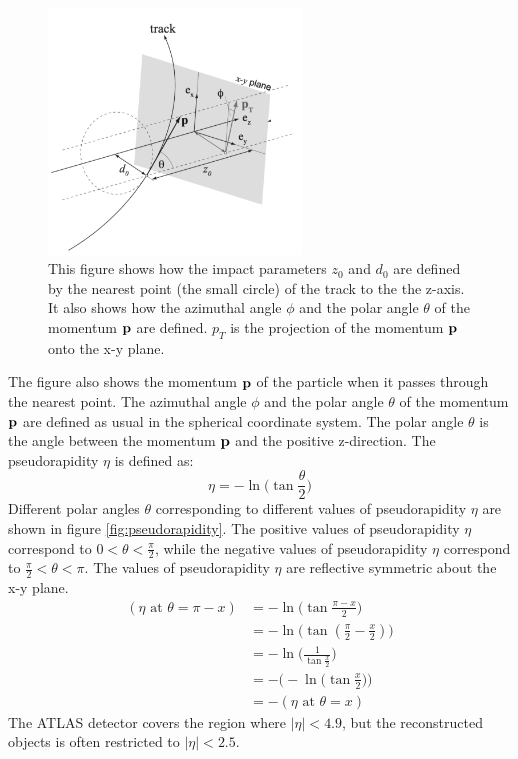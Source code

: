 \begin{figure}
\centering
\includegraphics[width=0.6\textwidth]{data/photo/detector/impact_parameter.png}
\caption{This figure shows how the impact parameters $z_0$ and $d_0$ are defined by the nearest point (the small circle) of the track to the the z-axis. It also shows how the azimuthal angle $\phi$ and the polar angle $\theta$ of the momentum $\bf{p}$ are defined. $p_T$ is the projection of the momentum $\bf{p}$ onto the x-y plane.}
\label{fig:impact_parameter}
\end{figure}

The figure also shows the momentum $\bf{p}$ of the particle when it passes through the nearest point.
The azimuthal angle $\phi$ and the polar angle $\theta$ of the momentum $\bf{p}$ are defined as usual in the spherical coordinate system.
The polar angle $\theta$ is the angle between the momentum $\bf{p}$ and the positive z-direction.
The pseudorapidity $\eta$ is defined as:
\begin{equation}
\eta = - \ln \Big( \tan \frac{\theta}{2} \Big)
\end{equation}
Different polar angles $\theta$ corresponding to different values of pseudorapidity $\eta$ are shown in figure \ref{fig:pseudorapidity}.
The positive values of pseudorapidity $\eta$ correspond to $0 <\theta< \frac{\pi}{2}$, while the negative values of pseudorapidity $\eta$ correspond to $\frac{\pi}{2} <\theta< \pi$.
The values of pseudorapidity $\eta$ are reflective symmetric about the x-y plane.
\begin{align}
( \eta \text{ at } \theta = \pi - x) &= - \ln \Big( \tan \frac{\pi - x}{2} \Big) \\
&= - \ln \Big( \tan (\frac{\pi}{2} - \frac{x}{2}) \Big) \\
&= - \ln \Big( \frac{1}{ \tan \frac{x}{2} } \Big) \\
&= - \Big( - \ln \Big( \tan \frac{x}{2} \Big) \Big) \\
&= - ( \eta \text{ at } \theta = x)
\end{align}
The ATLAS detector covers the region where $|\eta| < 4.9$, but the reconstructed objects is often restricted to $|\eta| < 2.5$.

